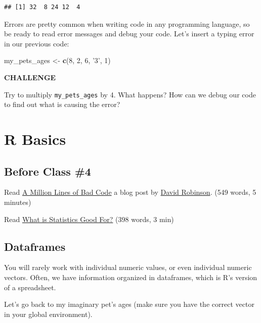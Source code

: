 \documentclass[
]{book}
\newenvironment{Shaded}{\begin{snugshade}}{\end{snugshade}}
\newcommand{\DecValTok}[1]{\textcolor[rgb]{0.00,0.00,0.81}{#1}}
\newcommand{\KeywordTok}[1]{\textcolor[rgb]{0.13,0.29,0.53}{\textbf{#1}}}
\newcommand{\NormalTok}[1]{#1}
\newcommand{\StringTok}[1]{\textcolor[rgb]{0.31,0.60,0.02}{#1}}
\begin{document}
\begin{verbatim}
## [1] 32  8 24 12  4
\end{verbatim}

Errors are pretty common when writing code in any programming language, so be ready to read error messages and debug your code. Let's insert a typing error in our previous code:

\begin{Shaded}
\begin{Highlighting}[]
\NormalTok{my_pets_ages <-}\StringTok{ }\KeywordTok{c}\NormalTok{(}\DecValTok{8}\NormalTok{, }\DecValTok{2}\NormalTok{, }\DecValTok{6}\NormalTok{, }\StringTok{'3'}\NormalTok{, }\DecValTok{1}\NormalTok{)}
\end{Highlighting}
\end{Shaded}

\textbf{CHALLENGE}

Try to multiply \texttt{my\_pets\_ages} by 4. What happens? How can we debug our code to find out what is causing the error?

\hypertarget{r-basics}{%
\chapter{R Basics}\label{r-basics}}

\hypertarget{before-class-4}{%
\section{Before Class \#4}\label{before-class-4}}

Read \href{http://varianceexplained.org/programming/bad-code/}{A Million Lines of Bad Code} a blog post by \href{http://varianceexplained.org/about/}{David Robinson}. (549 words, 5 minutes)

Read \href{readings/module7_eds_whats_stats.pdf}{What is Statistics Good For?} (398 words, 3 min)

\hypertarget{dataframes}{%
\section{Dataframes}\label{dataframes}}

You will rarely work with individual numeric values, or even individual numeric vectors. Often, we have information organized in dataframes, which is R's version of a spreadsheet.

Let's go back to my imaginary pet's ages (make sure you have the correct vector in your global environment).
\end{document}
